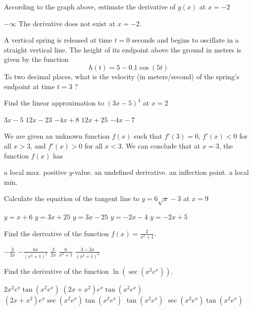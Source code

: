 \documentclass[11pt]{article}
\begin{document}
\begin{questions}
\begin{multiplechoice}{5}
\question According to the graph above, estimate the derivative of $g(x)$ at $x = -2$
\begin{answers}{2}
\ans $-\infty$
\ans The derivative does not exist at $x= -2$.
\end{answers}


\question A vertical spring is released at time $t = 0$ seconds and begins to oscillate in a straight vertical line.
The height of its endpoint above the ground in meters is given by the function
$$h(t) = 5 - 0.1\cos(5t)$$
To two decimal places, what is the velocity (in meters/second) of the spring's endpoint at time $t = 3$ ?
\begin{answers}{2}
\end{answers}

\newpage

\question Find the linear approximation to $(3x-5)^4$ at $x = 2$
\begin{answers}{2}
\ans $3x - 5$
\ans $12x - 23$
\ans $-4x + 8$
\ans $12x + 25$
\ans $-4x - 7$
\end{answers}


\question We are given an unknown function $f(x)$ such that $f'(3) = 0$, $f'(x) < 0$ for all $x > 3$, and $f'(x) > 0$ for all $x < 3$.
We can conclude that at $x = 3$, the function $f(x)$ has 
\begin{answers}{3}
\ans a local max.
\ans positive $y$-value.
\ans an undefined derivative.
\ans an inflection point.
\ans a local min.
\end{answers}

\question Calculate the equation of the tangent line to $y = 6 \sqrt{x} - 3$ at $x = 9$
\begin{answers}{2}
\ans $y = x + 6$
\ans $y = 3x + 25$
\ans $y = 3x - 25$
\ans $y = -2x -4$
\ans $y = -2x + 5$
\end{answers}


\question Find the derivative of the function $\displaystyle f(x) = \frac{3}{x^2 +1}$.
\begin{answers}{2}
\ans $ \displaystyle  - \frac{3}{2x}$
\ans $ \displaystyle -\frac{6x}{(x^2 + 1)^2}$
\ans $ \displaystyle  \frac{3}{2x}$
\ans $ \displaystyle \frac{6}{x^2 + 1}$
\ans $ \displaystyle  \frac{3 - 2x }{(x^2 + 1)^2}$
\end{answers}

\question Find the derivative of the function $\ln(\sec(x^2 e^x))$.
\begin{answers}{2}
\ans $2x^2e^x \tan(x^2 e^x)$
\ans $(2x + x^2)e^x \tan(x^2 e^x)$
\ans $(2x + x^2)e^x \sec(x^2 e^x)\tan(x^2 e^x)$
\ans $\tan(x^2 e^x)$
\ans $ \sec(x^2 e^x)\tan(x^2 e^x)$
\end{answers}


\end{multiplechoice}
\end{questions}
\end{document}
